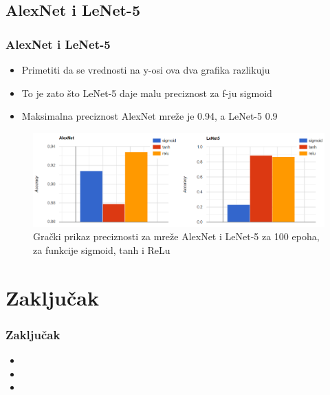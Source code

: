 \documentclass{beamer}
\begin{document}
\subsection{AlexNet i LeNet-5}
\begin{frame}
\frametitle{AlexNet i LeNet-5}

\begin{itemize}
\item Primetiti da se vrednosti na y-osi ova dva grafika razlikuju
\item To je zato što LeNet-5 daje malu preciznost za f-ju sigmoid
\item Maksimalna preciznost AlexNet mreže je 0.94, a LeNet-5 0.9

\end{itemize}

\begin{figure}
\includegraphics[scale=0.45]{graphs_alexnet_lenet.png}
\caption{Grački prikaz preciznosti za mreže AlexNet i LeNet-5 za 100 epoha, za funkcije sigmoid, tanh i ReLu}
\end{figure}

\end{frame}








\section{Zaključak}

\begin{frame}
\frametitle{Zaključak}

\begin{itemize}
\item
\item
\item
\end{itemize}

\end{frame}
\end{document}
